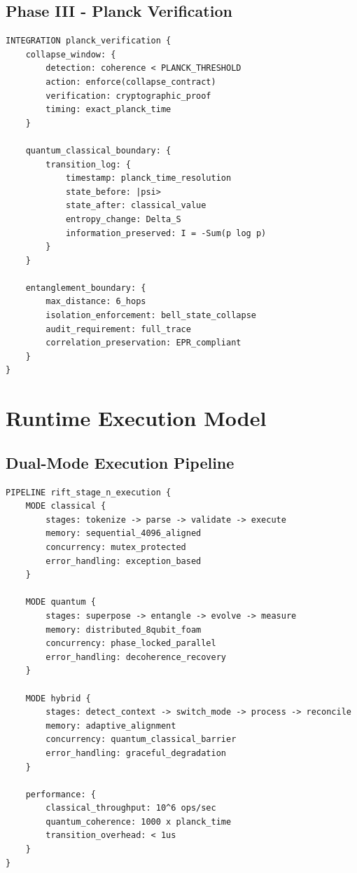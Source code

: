 \documentclass[12pt,a4paper]{article}
\begin{document}
\subsection{Phase III - Planck Verification}

\begin{lstlisting}[style=riftlang,caption={Planck Scale Verification}]
INTEGRATION planck_verification {
    collapse_window: {
        detection: coherence < PLANCK_THRESHOLD
        action: enforce(collapse_contract)
        verification: cryptographic_proof
        timing: exact_planck_time
    }
    
    quantum_classical_boundary: {
        transition_log: {
            timestamp: planck_time_resolution
            state_before: |psi>
            state_after: classical_value
            entropy_change: Delta_S
            information_preserved: I = -Sum(p log p)
        }
    }
    
    entanglement_boundary: {
        max_distance: 6_hops
        isolation_enforcement: bell_state_collapse
        audit_requirement: full_trace
        correlation_preservation: EPR_compliant
    }
}
\end{lstlisting}

\section{Runtime Execution Model}

\subsection{Dual-Mode Execution Pipeline}

\begin{lstlisting}[style=riftlang,caption={Stage-N Execution Pipeline}]
PIPELINE rift_stage_n_execution {
    MODE classical {
        stages: tokenize -> parse -> validate -> execute
        memory: sequential_4096_aligned
        concurrency: mutex_protected
        error_handling: exception_based
    }
    
    MODE quantum {
        stages: superpose -> entangle -> evolve -> measure
        memory: distributed_8qubit_foam
        concurrency: phase_locked_parallel
        error_handling: decoherence_recovery
    }
    
    MODE hybrid {
        stages: detect_context -> switch_mode -> process -> reconcile
        memory: adaptive_alignment
        concurrency: quantum_classical_barrier
        error_handling: graceful_degradation
    }
    
    performance: {
        classical_throughput: 10^6 ops/sec
        quantum_coherence: 1000 x planck_time
        transition_overhead: < 1us
    }
}
\end{lstlisting}
\end{document}
